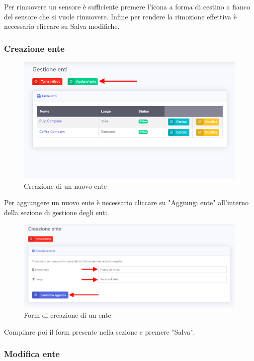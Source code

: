 		Per rimuovere un sensore è sufficiente premere l'icona a forma di cestino a fianco del sensore che si vuole rimuovere. Infine per rendere la rimozione effettiva è necessario cliccare su Salva modifiche. 

	\subsubsection{Creazione ente}

		\begin{figure}[H]
		\centering
		\includegraphics[scale=0.600]{res/images/admin/selCreazEnte.png}
		\caption{Creazione di un nuovo ente}
		\end{figure}

		Per aggiungere un nuovo ente è necessario cliccare su "Aggiungi ente" all'interno della sezione di gestione degli enti. 

		\begin{figure}[H]
		\centering
		\includegraphics[scale=0.600]{res/images/admin/creazEnte.png}
		\caption{Form di creazione di un ente}
	\end{figure}

		Compilare poi il form presente nella sezione e premere "Salva".


	\subsubsection{Modifica ente}


